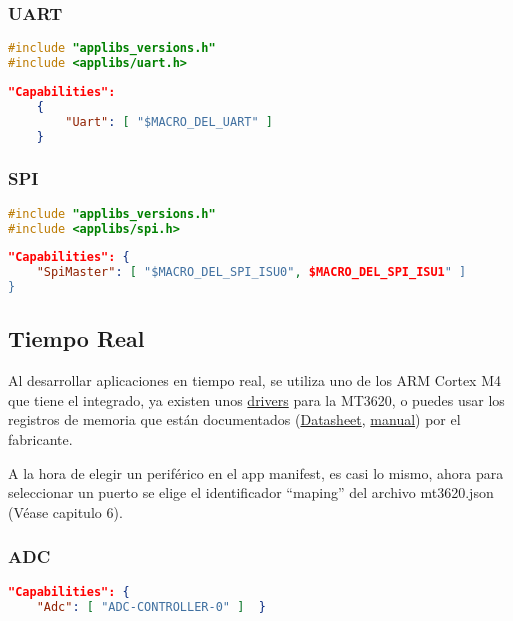 \subsubsection{UART}
\begin{lstlisting}[language = C, firstnumber=0]
#include "applibs_versions.h"
#include <applibs/uart.h>
\end{lstlisting}
\begin{lstlisting}[language = json, firstnumber=0]	
	"Capabilities": 
	{  
		"Uart": [ "$MACRO_DEL_UART" ] 
	}
\end{lstlisting}

\subsubsection{SPI}
\begin{lstlisting}[language = C, firstnumber=0]
#include "applibs_versions.h"
#include <applibs/spi.h>
\end{lstlisting}
\begin{lstlisting}[language = json, firstnumber=0]	
"Capabilities": {  
	"SpiMaster": [ "$MACRO_DEL_SPI_ISU0", $MACRO_DEL_SPI_ISU1" ]
}
\end{lstlisting}

\subsection{Tiempo Real}
Al desarrollar aplicaciones en tiempo real, se utiliza uno de los ARM Cortex M4 que tiene el integrado, ya existen unos \hyperlink{https://github.com/CodethinkLabs/mt3620-m4-drivers/tree/master}{drivers} para la MT3620, o puedes usar los registros de memoria que están documentados (\hyperlink{https://d86o2zu8ugzlg.cloudfront.net/mediatek-craft/documents/mt3620/MT3620-Datasheet-v1.7.pdf}{Datasheet},
\hyperlink{https://d86o2zu8ugzlg.cloudfront.net/mediatek-craft/documents/MT3620-M4-User-Manual.pdf}{manual}) por el fabricante.

A la hora de elegir un periférico en el app manifest, es casi lo mismo, ahora para seleccionar un puerto se elige el identificador ``maping'' del archivo mt3620.json (Véase capitulo 6).

\subsubsection{ADC}
\begin{lstlisting}[language = json, firstnumber=0]	
"Capabilities": {
	"Adc": [ "ADC-CONTROLLER-0" ]  }
\end{lstlisting}

